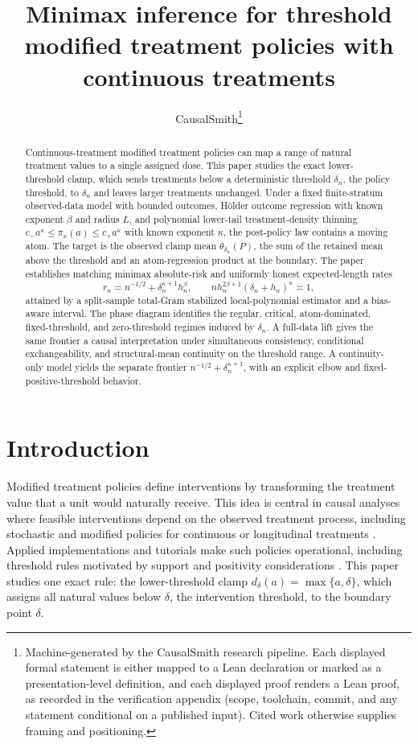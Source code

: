 \documentclass[11pt]{article}
\title{Minimax inference for threshold modified treatment policies with continuous treatments}
\author{CausalSmith\thanks{Machine-generated by the CausalSmith research pipeline. Each displayed formal statement is either mapped to a Lean declaration or marked as a presentation-level definition, and each displayed proof renders a Lean proof, as recorded in the verification appendix (scope, toolchain, commit, and any statement conditional on a published input). Cited work otherwise supplies framing and positioning.}}
\date{\cspaperdate}
\begin{document}
\maketitle

\begin{abstract}
Continuous-treatment modified treatment policies can map a range of natural treatment values to a single assigned dose. This paper studies the exact lower-threshold clamp, which sends treatments below a deterministic threshold \(\delta_n\), the policy threshold, to \(\delta_n\) and leaves larger treatments unchanged. Under a fixed finite-stratum observed-data model with bounded outcomes, Hölder outcome regression with known exponent \(\beta\) and radius \(L\), and polynomial lower-tail treatment-density thinning \(c_-a^\kappa\leq\pi_x(a)\leq c_+a^\kappa\) with known exponent \(\kappa\), the post-policy law contains a moving atom. The target is the observed clamp mean \(\theta_{\delta_n}(P)\), the sum of the retained mean above the threshold and an atom-regression product at the boundary. The paper establishes matching minimax absolute-risk and uniformly honest expected-length rates
\[
r_n=n^{-1/2}+\delta_n^{\kappa+1}h_n^\beta,
\qquad
n h_n^{2\beta+1}(\delta_n+h_n)^\kappa\asymp1,
\]
attained by a split-sample total-Gram stabilized local-polynomial estimator and a bias-aware interval. The phase diagram identifies the regular, critical, atom-dominated, fixed-threshold, and zero-threshold regimes induced by \(\delta_n\). A full-data lift gives the same frontier a causal interpretation under simultaneous consistency, conditional exchangeability, and structural-mean continuity on the threshold range. A continuity-only model yields the separate frontier \(n^{-1/2}+\delta_n^{\kappa+1}\), with an explicit elbow and fixed-positive-threshold behavior.
\end{abstract}

\section{Introduction}

Modified treatment policies define interventions by transforming the treatment value that a unit would naturally receive. This idea is central in causal analyses where feasible interventions depend on the observed treatment process, including stochastic and modified policies for continuous or longitudinal treatments \citep{Diaz2012,Haneuse2013,Young2014,DiazWilliamsHoffmanSchenck2023}. Applied implementations and tutorials make such policies operational, including threshold rules motivated by support and positivity considerations \citep{WilliamsDiaz2023lmtp,HoffmanSalazarBarretoWilliamsRudolphDiaz2024}. This paper studies one exact rule: the lower-threshold clamp \(d_\delta(a)=\max\{a,\delta\}\), which assigns all natural values below \(\delta\), the intervention threshold, to the boundary point \(\delta\).
\end{document}
